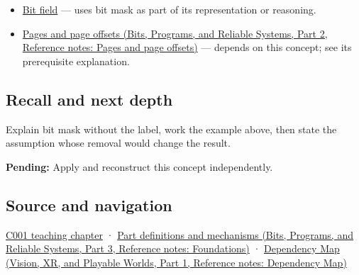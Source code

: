 \hypertarget{appendix-dbe5905163c2-used-by}{}

\begin{itemize}
\item
  \hyperref[appendix-ac697f5c66e8]{Bit field} --- uses bit mask as part of its representation or reasoning.
\item
  \href{../01-Bits-Programs-and-Reliable-Systems-P02/main.pdf\#appendix-0c67cd5bf30a}{Pages and page offsets (Bits, Programs, and Reliable Systems, Part 2, Reference notes: Pages and page offsets)} --- depends on this concept; see its prerequisite explanation.
\end{itemize}

\subsection{Recall and next depth}\label{appendix-dbe5905163c2-recall-and-next-depth}

\hypertarget{appendix-dbe5905163c2-recall-and-next-depth}{}

Explain bit mask without the label, work the example above, then state the assumption whose removal would change the result.

\textbf{Pending:} Apply and reconstruct this concept independently.

\subsection{Source and navigation}\label{appendix-dbe5905163c2-source-and-navigation}

\hypertarget{appendix-dbe5905163c2-source-and-navigation}{}

\hyperref[01-foundations-i-ch001-from-a-signal-to-an-interpretation]{C001 teaching chapter} · \href{../01-Bits-Programs-and-Reliable-Systems-P03/main.pdf\#appendix-fd090d982a15}{Part definitions and mechanisms (Bits, Programs, and Reliable Systems, Part 3, Reference notes: Foundations)} · \href{../07-Vision-XR-and-Playable-Worlds-P01/main.pdf\#appendix-4ad47bdd269a}{Dependency Map (Vision, XR, and Playable Worlds, Part 1, Reference notes: Dependency Map)}
